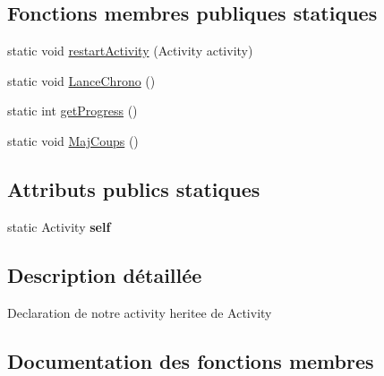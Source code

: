 \subsection*{Fonctions membres publiques statiques}
\begin{DoxyCompactItemize}
\item 
static void \hyperlink{classp8_1_1demo_1_1p8sokoban_1_1p8___sokoban_a956b703af9704745d8deffb1cf882249}{restart\+Activity} (Activity activity)
\item 
static void \hyperlink{classp8_1_1demo_1_1p8sokoban_1_1p8___sokoban_aba7394226cddb3359f918156472ac556}{Lance\+Chrono} ()
\item 
static int \hyperlink{classp8_1_1demo_1_1p8sokoban_1_1p8___sokoban_a75dbd4522cc44e46789299c7d52ba949}{get\+Progress} ()
\item 
static void \hyperlink{classp8_1_1demo_1_1p8sokoban_1_1p8___sokoban_a56fe9b42873640012e8b77d992a55480}{Maj\+Coups} ()
\end{DoxyCompactItemize}
\subsection*{Attributs publics statiques}
\begin{DoxyCompactItemize}
\item 
\hypertarget{classp8_1_1demo_1_1p8sokoban_1_1p8___sokoban_a872560ba71477fcbc9b7b878ecc9529e}{}static Activity {\bfseries self}\label{classp8_1_1demo_1_1p8sokoban_1_1p8___sokoban_a872560ba71477fcbc9b7b878ecc9529e}

\end{DoxyCompactItemize}


\subsection{Description détaillée}
Declaration de notre activity heritee de Activity 

\subsection{Documentation des fonctions membres}
\hypertarget{classp8_1_1demo_1_1p8sokoban_1_1p8___sokoban_a75dbd4522cc44e46789299c7d52ba949}{}
